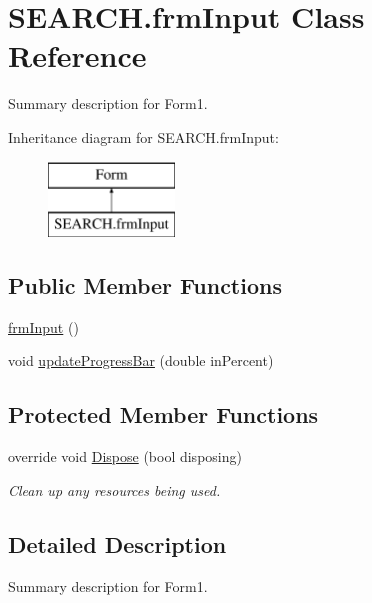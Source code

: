 \hypertarget{class_s_e_a_r_c_h_1_1frm_input}{\section{S\-E\-A\-R\-C\-H.\-frm\-Input Class Reference}
\label{class_s_e_a_r_c_h_1_1frm_input}
}


Summary description for Form1.  


Inheritance diagram for S\-E\-A\-R\-C\-H.\-frm\-Input\-:\begin{figure}[H]
\begin{center}
\leavevmode
\includegraphics[height=2.000000cm]{class_s_e_a_r_c_h_1_1frm_input}
\end{center}
\end{figure}
\subsection*{Public Member Functions}
\begin{DoxyCompactItemize}
\item 
\hyperlink{class_s_e_a_r_c_h_1_1frm_input_aef8aca701799d18fc50d3996e74e362a}{frm\-Input} ()
\item 
void \hyperlink{class_s_e_a_r_c_h_1_1frm_input_af224be2bfaa8ba98bd554cbf6879b62f}{update\-Progress\-Bar} (double in\-Percent)
\end{DoxyCompactItemize}
\subsection*{Protected Member Functions}
\begin{DoxyCompactItemize}
\item 
override void \hyperlink{class_s_e_a_r_c_h_1_1frm_input_a3749220065441a91720e838a1f8d8e2e}{Dispose} (bool disposing)
\begin{DoxyCompactList}\small\item\em Clean up any resources being used. \end{DoxyCompactList}\end{DoxyCompactItemize}


\subsection{Detailed Description}
Summary description for Form1. 



